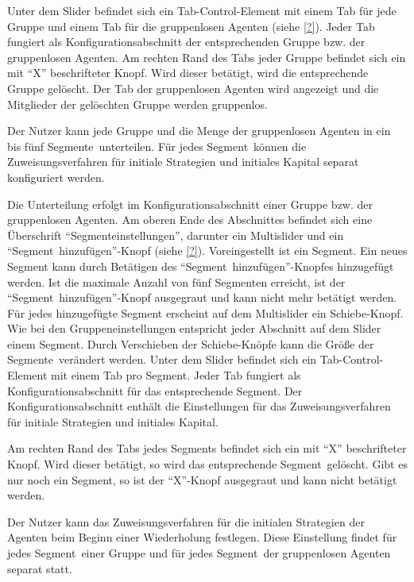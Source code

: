 \documentclass[parskip=full,11pt]{scrartcl}
\def\segment{Segment}
\def\segments{Segmente}
\begin{document}
Unter dem Slider befindet sich ein Tab-Control-Element mit einem Tab für jede Gruppe und einem Tab für die gruppenlosen Agenten (siehe \cref{?}). Jeder Tab fungiert als Konfigurationsabschnitt der entsprechenden Gruppe bzw. der gruppenlosen Agenten. Am rechten Rand des Tabs jeder Gruppe befindet sich ein mit \enquote{X} beschrifteter Knopf. Wird dieser betätigt, wird die entsprechende Gruppe gelöscht. Der Tab der gruppenlosen Agenten wird angezeigt und die Mitglieder der gelöschten Gruppe werden gruppenlos.

\functionality{Einteilung von Gruppen in \segments}{fnc:segments}
Der Nutzer kann jede Gruppe und die Menge der gruppenlosen Agenten in ein bis fünf \segments\ unterteilen. Für jedes \segment\ können die Zuweisungsverfahren für initiale Strategien und initiales Kapital separat konfiguriert werden.

Die Unterteilung erfolgt im Konfigurationsabschnitt einer Gruppe bzw. der gruppenlosen Agenten. Am oberen Ende des Abschnittes befindet sich eine Überschrift \enquote{\segment einstellungen}, darunter ein Multislider und ein \enquote{\segment\ hinzufügen}-Knopf (siehe \cref{?}). Voreingestellt ist ein Segment. Ein neues Segment kann durch Betätigen des \enquote{\segment\ hinzufügen}-Knopfes hinzugefügt werden. Ist die maximale Anzahl von fünf \segments n erreicht, ist der \enquote{\segment\ hinzufügen}-Knopf ausgegraut und kann nicht mehr betätigt werden. Für jedes hinzugefügte Segment erscheint auf dem Multislider ein Schiebe-Knopf. Wie bei den Gruppeneinstellungen entspricht jeder Abschnitt auf dem Slider einem \segment. Durch Verschieben der Schiebe-Knöpfe kann die Größe der \segments\ verändert werden. Unter dem Slider befindet sich ein Tab-Control-Element mit einem Tab pro \segment. Jeder Tab fungiert als Konfigurationsabschnitt für das entsprechende \segment. Der Konfigurationsabschnitt enthält die Einstellungen für das Zuweisungsverfahren für initiale Strategien und initiales Kapital.

Am rechten Rand des Tabs jedes \segment s befindet sich ein mit \enquote{X} beschrifteter Knopf. Wird dieser betätigt, so wird das entsprechende \segment\ gelöscht. Gibt es nur noch ein \segment, so ist der \enquote{X}-Knopf ausgegraut und kann nicht betätigt werden.

Der Nutzer kann das Zuweisungsverfahren für die initialen Strategien der Agenten beim Beginn einer Wiederholung festlegen. Diese Einstellung findet für jedes \segment\ einer Gruppe und für jedes \segment\ der gruppenlosen Agenten separat statt.
\end{document}
